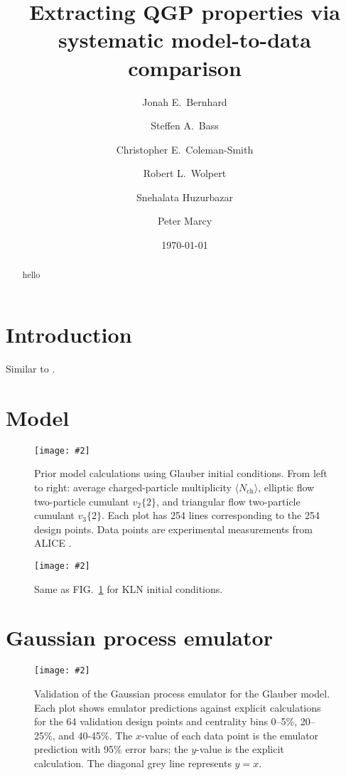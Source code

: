 \documentclass[aps, prc, reprint, amsmath]{revtex4-1}
\newcommand{\widefig}[3][t]{
  \begin{figure*}[#1]
    \texttt{[image: \#2]}
    \caption{\label{fig:#2}#3}
  \end{figure*}
}
\newcommand{\avg}[1]{\langle #1 \rangle}
\newcommand{\nch}{N_\text{ch}}
\newcommand{\vnk}[2]{v_#1\{#2\}}
\begin{document}
\title{Extracting QGP properties via systematic model-to-data comparison}

\author{Jonah E.\ Bernhard}
\author{Steffen A.\ Bass}
\author{Christopher E.\ Coleman-Smith}
\author{Robert L.\ Wolpert}

\author{Snehalata Huzurbazar}

\author{Peter Marcy}


\date{\today}

\begin{abstract}
  hello
\end{abstract}

\maketitle


\section{Introduction}

Similar to \cite{pratt-mtd, soltz-mtd}.


\section{Model}

\cite{bass-dumitru, nonaka-bass, song}
\cite{glauber}
\cite{kln}
\cite{vish}
\cite{cooper-frye}
\cite{iss}
\cite{urqmd1, urqmd2}
\cite{iebe}

\widefig{prior_draws_glb}{
  Prior model calculations using Glauber initial conditions.
  From left to right:
  average charged-particle multiplicity $\avg\nch$,
  elliptic flow two-particle cumulant $\vnk 2 2$,
  and triangular flow two-particle cumulant $\vnk 3 2$.
  Each plot has 254 lines corresponding to the 254 design points.
  Data points are experimental measurements from ALICE \cite{alice-cumulants}.
}

\widefig{prior_draws_kln}{
  Same as FIG.~\ref{fig:prior_draws_glb} for KLN initial conditions.
}


\section{Gaussian process emulator}

\cite{gpml}
\cite{ohagan, higdon2008, higdon2014}

\widefig{validation_glb}{
  Validation of the Gaussian process emulator for the Glauber model.
  Each plot shows emulator predictions against explicit calculations for the 64 validation design points and centrality bins 0--5\%, 20--25\%, and 40-45\%.
  The $x$-value of each data point is the emulator prediction with 95\% error bars; the $y$-value is the explicit calculation.
  The diagonal grey line represents $y = x$.
}
\end{document}
